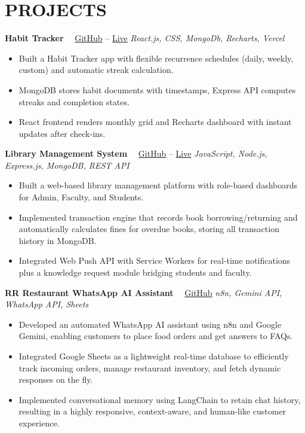 \documentclass[letterpaper,11pt]{article}
\begin{document}
\section*{PROJECTS}

\noindent\textbf{Habit Tracker} \ \
\textcolor{blue}{\href{https://github.com/Rithwik007/habit-tracker-web2}{GitHub}}  --  \textcolor{blue}{\href{https://habit-tracker-web2.vercel.app/}{Live}}  \hfill \textit{React.js, CSS, MongoDb, Recharts, Vercel}

\begin{itemize}
\item Built a Habit Tracker app with flexible recurrence schedules (daily, weekly, custom) and automatic streak calculation.
\item MongoDB stores habit documents with timestamps, Express API computes streaks and completion states.
\item React frontend renders monthly grid and Recharts dashboard with instant updates after check-ins.

\end{itemize}

\noindent\textbf{Library Management System} \ \ 
\textcolor{blue}{\href{https://github.com/Rithwik007/Library-Management}{GitHub}} --  \textcolor{blue}{\href{https://library-management-frontend-ten-tan.vercel.app}{Live}} \hfill \textit{JavaScript, Node.js, Express.js, MongoDB, REST API}

\begin{itemize}
\item Built a web-based library management platform with role-based dashboards for Admin, Faculty, and Students.
\item Implemented transaction engine that records book borrowing/returning and automatically calculates fines for overdue books, storing all transaction history in MongoDB.
\item Integrated Web Push API with Service Workers for real-time notifications plus a knowledge request module bridging students and faculty.

\end{itemize}

\noindent\textbf{RR Restaurant WhatsApp AI Assistant}  \ \
\textcolor{blue}{\href{https://github.com/Rithwik007/n8n_automation_usecase}{GitHub}} \hfill \textit{n8n, Gemini API, WhatsApp API, Sheets}


\begin{itemize}
\item Developed an automated WhatsApp AI assistant using n8n and Google Gemini, enabling customers to place food orders and get answers to FAQs.
\item Integrated Google Sheets as a lightweight real-time database to efficiently track incoming orders, manage restaurant inventory, and fetch dynamic responses on the fly.
\item Implemented conversational memory using LangChain to retain chat history, resulting in a highly responsive, context-aware, and human-like customer experience.

\end{itemize}
\end{document}
